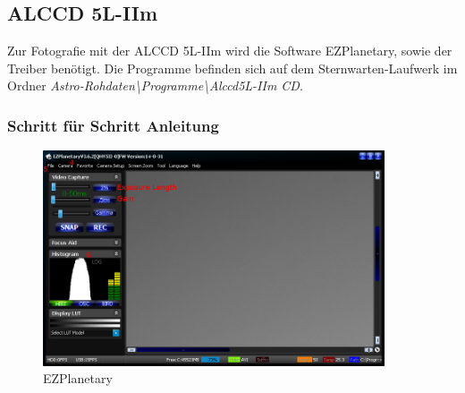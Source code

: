 \documentclass[10pt,a4paper,titlepage]{article}
\begin{document}
\subsection{ALCCD 5L-IIm}
Zur Fotografie mit der ALCCD 5L-IIm wird die Software EZPlanetary, sowie der Treiber benötigt. Die Programme befinden sich auf dem Sternwarten-Laufwerk im Ordner \textit{Astro-Rohdaten\textbackslash Programme\textbackslash Alccd5L-IIm CD}.

\subsubsection{Schritt für Schritt Anleitung}

\begin{figure}[h!]
  \centering
    \includegraphics[width=0.9\textwidth]{EZPlanetary-annotiert}
  \caption{EZPlanetary}
  \label{fig:ezplanetary}
\end{figure}
\end{document}
